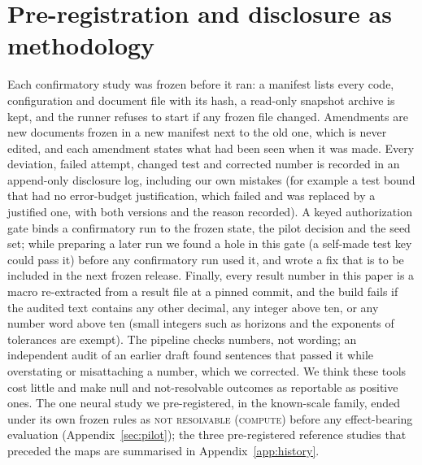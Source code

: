 \section{Pre-registration and disclosure as methodology}\label{sec:method}
Each confirmatory study was frozen before it ran: a manifest lists every code, configuration and document file with its
\shaname hash, a read-only snapshot archive is kept, and the runner refuses to start if any frozen file changed. Amendments are
new documents frozen in a new manifest next to the old one, which is never edited, and each amendment states what had been
seen when it was made. Every deviation, failed attempt, changed test and corrected number is recorded in an append-only
disclosure log, including our own mistakes (for example a test bound that had no error-budget justification, which failed
and was replaced by a justified one, with both versions and the reason recorded). A keyed authorization gate binds a
confirmatory run to the frozen state, the pilot decision and the seed set; while preparing a later run we found a hole in
this gate (a self-made test key could pass it) before any confirmatory run used it, and wrote a fix that is to be included
in the next frozen release. Finally, every result number in this paper is a macro re-extracted from a result file at a
pinned commit, and the build fails if the audited text contains any other decimal, any integer above ten, or any number
word above ten (small integers such as horizons and the exponents of tolerances are exempt). The pipeline checks numbers,
not wording; an independent audit of an earlier draft found sentences that passed it while overstating or misattaching a
number, which we corrected. We think these tools cost little and make null and not-resolvable outcomes as reportable as
positive ones. The one neural study we pre-registered, in the known-scale family, ended under its own frozen rules as
\textsc{not resolvable (compute)} before any effect-bearing evaluation (Appendix~\ref{sec:pilot}); the three pre-registered
reference studies that preceded the maps are summarised in Appendix~\ref{app:history}.
